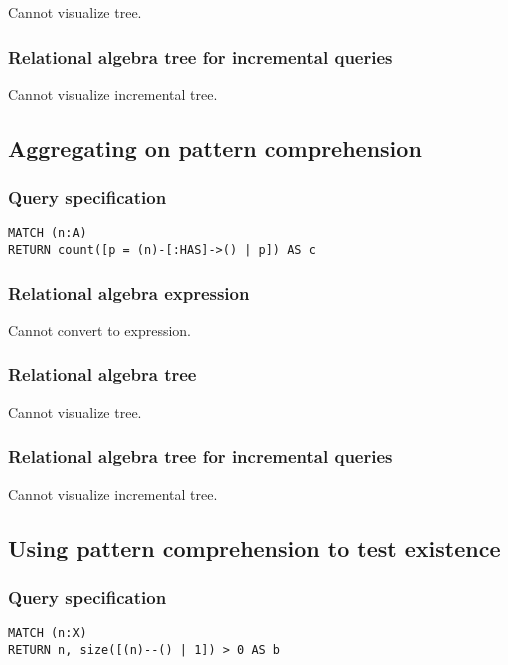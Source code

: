 Cannot visualize tree.

\subsubsection*{Relational algebra tree for incremental queries}

Cannot visualize incremental tree.

\subsection{Aggregating on pattern comprehension}

\subsubsection*{Query specification}

\begin{lstlisting}
MATCH (n:A)
RETURN count([p = (n)-[:HAS]->() | p]) AS c
\end{lstlisting}

\subsubsection*{Relational algebra expression}

Cannot convert to expression.

\subsubsection*{Relational algebra tree}

Cannot visualize tree.

\subsubsection*{Relational algebra tree for incremental queries}

Cannot visualize incremental tree.

\subsection{Using pattern comprehension to test existence}

\subsubsection*{Query specification}

\begin{lstlisting}
MATCH (n:X)
RETURN n, size([(n)--() | 1]) > 0 AS b
\end{lstlisting}

